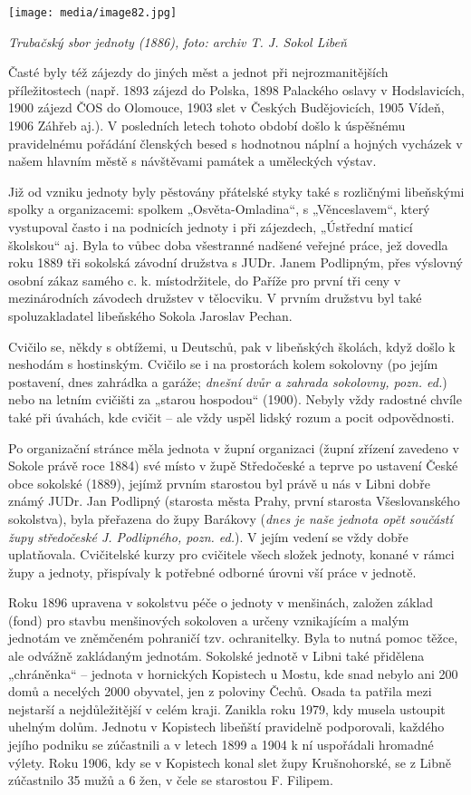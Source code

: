 \texttt{[image: media/image82.jpg]}

\emph{Trubačský sbor jednoty (1886), foto: archiv T. J. Sokol Libeň}

Časté byly též zájezdy do jiných měst a jednot při nejrozmanitějších
příležitostech (např. 1893 zájezd do Polska, 1898 Palackého oslavy v
Hodslavicích, 1900 zájezd ČOS do Olomouce, 1903 slet v Českých
Budějovicích, 1905 Vídeň, 1906 Záhřeb aj.). V posledních letech tohoto
období došlo k úspěšnému pravidelnému pořádání členských besed s
hodnotnou náplní a hojných vycházek v našem hlavním městě s návštěvami
památek a uměleckých výstav.

Již od vzniku jednoty byly pěstovány přátelské styky také s rozličnými
libeňskými spolky a organizacemi: spolkem „Osvěta-Omladina``, s
„Věnceslavem``, který vystupoval často i na podnicích jednoty i při
zájezdech, „Ústřední maticí školskou`` aj. Byla to vůbec doba všestranné
nadšené veřejné práce, jež dovedla roku 1889 tři sokolská závodní
družstva s JUDr. Janem Podlipným, přes výslovný osobní zákaz samého c.
k. místodržitele, do Paříže pro první tři ceny v mezinárodních závodech
družstev v tělocviku. V prvním družstvu byl také spoluzakladatel
libeňského Sokola Jaroslav Pechan.

Cvičilo se, někdy s obtížemi, u Deutschů, pak v libeňských školách, když
došlo k neshodám s hostinským. Cvičilo se i na prostorách kolem
sokolovny (po jejím postavení, dnes zahrádka a garáže; \emph{dnešní dvůr
a zahrada sokolovny, pozn. ed.}) nebo na letním cvičišti za „starou
hospodou`` (1900). Nebyly vždy radostné chvíle také při úvahách, kde
cvičit -- ale vždy uspěl lidský rozum a pocit odpovědnosti.

Po organizační stránce měla jednota v župní organizaci (župní zřízení
zavedeno v Sokole právě roce 1884) své místo v župě Středočeské a teprve
po ustavení České obce sokolské (1889), jejímž prvním starostou byl
právě u nás v Libni dobře známý JUDr. Jan Podlipný (starosta města
Prahy, první starosta Všeslovanského sokolstva), byla přeřazena do župy
Barákovy (\emph{dnes je naše jednota opět součástí župy středočeské J.
Podlipného, pozn. ed.}). V jejím vedení se vždy dobře uplatňovala.
Cvičitelské kurzy pro cvičitele všech složek jednoty, konané v rámci
župy a jednoty, přispívaly k potřebné odborné úrovni vší práce v
jednotě.

Roku 1896 upravena v sokolstvu péče o jednoty v menšinách, založen
základ (fond) pro stavbu menšinových sokoloven a určeny vznikajícím a
malým jednotám ve zněmčeném pohraničí tzv. ochranitelky. Byla to nutná
pomoc těžce, ale odvážně zakládaným jednotám. Sokolské jednotě v Libni
také přidělena „chráněnka`` -- jednota v hornických Kopistech u Mostu,
kde snad nebylo ani 200 domů a necelých 2000 obyvatel, jen z poloviny
Čechů. Osada ta patřila mezi nejstarší a nejdůležitější v celém kraji.
Zanikla roku 1979, kdy musela ustoupit uhelným dolům. Jednotu v
Kopistech libeňští pravidelně podporovali, každého jejího podniku se
zúčastnili a v letech 1899 a 1904 k ní uspořádali hromadné výlety. Roku
1906, kdy se v Kopistech konal slet župy Krušnohorské, se z Libně
zúčastnilo 35 mužů a 6 žen, v čele se starostou F. Filipem.

